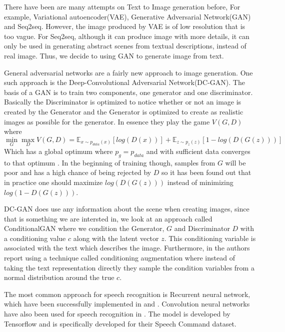 \documentclass[../main.tex]{subfiles}
\begin{document}
There have been are many attempts on Text to Image generation before, For example, Variational autoencoder(VAE), Generative Adversarial Network(GAN) and Seq2seq. However, the image produced by VAE is of low resolution that is too vague. For Seq2seq, although it can produce image with more details, it can only be used in generating abstract scenes from textual descriptions, instead of real image. Thus, we decide to using GAN to generate image from text.
\par
General adversarial networks are a fairly new approach to image generation. One such approach is the Deep-Convolutional Adversarial Network(DC-GAN)\cite{radford2015dcgan}. The basis of a GAN is to train two components, one generator and one discriminator. Basically the Discriminator is optimized to notice whether or not an image is created by the Generator and the Generator is optimized to create as realistic images as possible for the generator. In essence they play the game $V(G,D)$ where
\begin{equation}
    \min_G \max_D V(G,D) = \mathbb{E}_{x\sim p_{data}(x)}[log(D(x))] + \mathbb{E}_{z\sim p_{z}(z)}[1 - log(D(G(z)))]
\end{equation}
Which has a global optimum where $p_g = p_{data}$ and with sufficient data converges to that optimum \cite{goodfellow2014generative}. In the beginning of training though, samples from $G$ will be poor and has a high chance of being rejected by $D$ so it has been found out that in practice one should maximize $log(D(G(z)))$ instead of minimizing $log(1 - D(G(z)))$\cite{reed2016generative}.
\par
DC-GAN does use any information about the scene when creating images, since that is something we are intersted in, we look at an approach called ConditionalGAN  \cite{mirza2014conditionalgan} where we condition the Generator, $G$ and Discriminator $D$ with a conditioning value $c$ along with the latent vector $z$. This conditioning variable is associated with the text which describes the image. Furthermore, in \cite{zhang2017stackgan} the authors report using a technique called conditioning augmentation where instead of taking the text representation directly they sample the condition variables from a normal distribution around the true $c$.

The most common approach for speech recognition is Recurrent neural network, which have been successfully implemented in \cite{hannun2014deep} and \cite{sak2014long}. Convolution neural networks have also been used for speech recognition in \cite{speechcommandsv2}. The model is developed by Tensorflow and is specifically developed for their Speech Command dataset.
\end{document}
